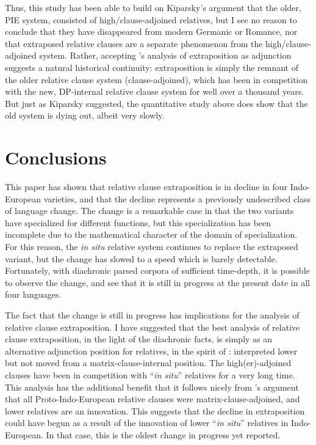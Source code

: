 Thus, this study has been able to build on Kiparsky's argument that the older, PIE system, consisted of high/clause-adjoined relatives, but I see no reason to conclude that they have disappeared from modern Germanic or Romance, nor that extraposed relative clauses are a separate phenomenon from the high/clause-adjoined system. Rather, accepting \citet{culicoverrochemont1990}'s analysis of extraposition as adjunction suggests a natural historical continuity: extraposition is simply the remnant of the older relative clause system (clause-adjoined), which has been in competition with the new, DP-internal relative clause system for well over a thousand years. But just as Kiparsky suggested, the quantitative study above does show that the old system is dying out, albeit very slowly.


\section{Conclusions}


This paper has shown that relative clause extraposition is in decline in four Indo-European varieties, and that the decline represents a previously undescribed class of language change. The change is a remarkable case in that the two variants have specialized for different functions, but this specialization has been incomplete due to the mathematical character of the domain of specialization. For this reason, the \textsl{in situ} relative system continues to replace the extraposed variant, but the change has slowed to a speed which is barely detectable. Fortunately, with diachronic parsed corpora of sufficient time-depth, it is possible to observe the change, and see that it is still in progress at the present date in all four languages.

The fact that the change is still in progress has implications for the analysis of relative clause extraposition. I have suggested that the best analysis of relative clause extraposition, in the light of the diachronic facts, is simply as an alternative adjunction position for relatives, in the spirit of \citet{culicoverrochemont1990}: interpreted lower but not moved from a matrix-clause-internal position. The high(er)-adjoined clauses have been in competition with ``\textsl{in situ}'' relatives for a very long time. This analysis has the additional benefit that it follows nicely from \citet{kiparsky1995}'s argument that all Proto-Indo-European relative clauses were matrix-clause-adjoined, and lower relatives are an innovation. This suggests that the decline in extraposition could have begun as a result of the innovation of lower ``\textsl{in situ}'' relatives in Indo-European. In that case, this is the oldest change in progress yet reported.



